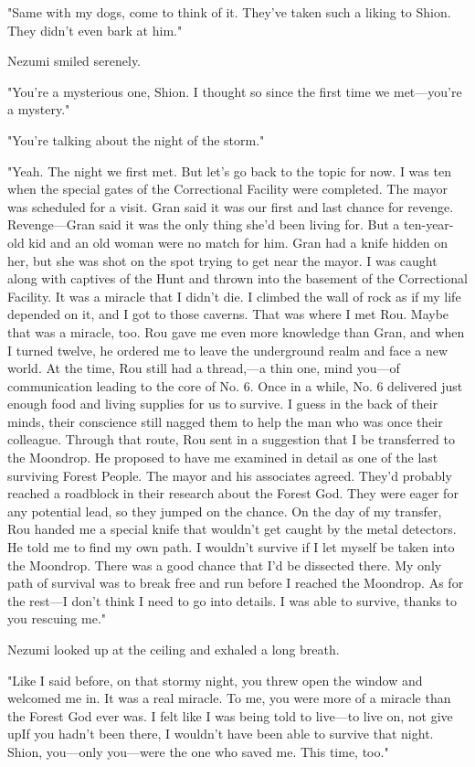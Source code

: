 "Same with my dogs, come to think of it. They've taken such a liking to
Shion. They didn't even bark at him."

Nezumi smiled serenely.

"You're a mysterious one, Shion. I thought so since the first time we
met---you're a mystery."

"You're talking about the night of the storm."

"Yeah. The night we first met. But let's go back to the topic for now. I
was ten when the special gates of the Correctional Facility were
completed. The mayor was scheduled for a visit. Gran said it was our
first and last chance for revenge. Revenge---Gran said it was the only
thing she'd been living for. But a ten-year-old kid and an old woman
were no match for him. Gran had a knife hidden on her, but she was shot
on the spot trying to get near the mayor. I was caught along with
captives of the Hunt and thrown into the basement of the Correctional
Facility. It was a miracle that I didn't die. I climbed the wall of rock
as if my life depended on it, and I got to those caverns. That was where
I met Rou. Maybe that was a miracle, too. Rou gave me even more
knowledge than Gran, and when I turned twelve, he ordered me to leave
the underground realm and face a new world. At the time, Rou still had a
thread,---a thin one, mind you---of communication leading to the core of No.
6. Once in a while, No. 6 delivered just enough food and living supplies
for us to survive. I guess in the back of their minds, their conscience
still nagged them to help the man who was once their colleague. Through
that route, Rou sent in a suggestion that I be transferred to the
Moondrop. He proposed to have me examined in detail as one of the last
surviving Forest People. The mayor and his associates agreed. They'd
probably reached a roadblock in their research about the Forest God.
They were eager for any potential lead, so they jumped on the chance. On
the day of my transfer, Rou handed me a special knife that wouldn't get
caught by the metal detectors. He told me to find my own path. I
wouldn't survive if I let myself be taken into the Moondrop. There was a
good chance that I'd be dissected there. My only path of survival was to
break free and run before I reached the Moondrop. As for the rest---I
don't think I need to go into details. I was able to survive, thanks to
you rescuing me."

Nezumi looked up at the ceiling and exhaled a long breath.

"Like I said before, on that stormy night, you threw open the window and
welcomed me in. It was a real miracle. To me, you were more of a miracle
than the Forest God ever was. I felt like I was being told to live---to
live on, not give up\el If you hadn't been there, I wouldn't have been
able to survive that night. Shion, you---only you---were the one who saved
me. This time, too."

